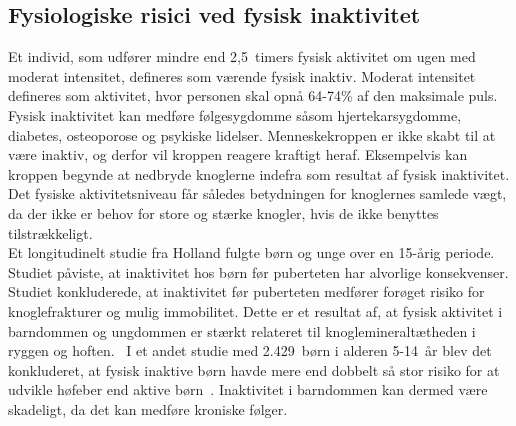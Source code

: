 \subsection{Fysiologiske risici ved fysisk inaktivitet}\label{subsec:inover}
Et individ, som udfører mindre end 2,5~timers fysisk aktivitet om ugen med moderat intensitet, defineres som værende fysisk inaktiv. Moderat intensitet defineres som aktivitet, hvor personen skal opnå 64-74\% af den maksimale puls.~\citep{Kiens2007} \\
Fysisk inaktivitet kan medføre følgesygdomme såsom hjertekarsygdomme, diabetes, osteoporose og psykiske lidelser. Menneskekroppen er ikke skabt til at være inaktiv, og derfor vil kroppen reagere kraftigt heraf. Eksempelvis kan kroppen begynde at nedbryde knoglerne indefra som resultat af fysisk inaktivitet. Det fysiske aktivitetsniveau får således betydningen for knoglernes samlede vægt, da der ikke er behov for store og stærke knogler, hvis de ikke benyttes tilstrækkeligt.~\citep{Kiens2007,Reshma2002,Martini2012} \\
Et longitudinelt studie fra Holland fulgte børn og unge over en 15-årig periode. Studiet påviste, at inaktivitet hos børn før puberteten har alvorlige konsekvenser. Studiet konkluderede, at inaktivitet før puberteten medfører forøget risiko for knoglefrakturer og mulig immobilitet. Dette er et resultat af, at fysisk aktivitet i barndommen og ungdommen er stærkt relateret til knoglemineraltætheden i ryggen og hoften.~\citep{Kemper2000} I et andet studie med 2.429~børn i alderen 5-14~år blev det konkluderet, at fysisk inaktive børn havde mere end dobbelt så stor risiko for at udvikle høfeber end aktive børn~\citep{Kohlhammer2006}. Inaktivitet i barndommen kan dermed være skadeligt, da det kan medføre kroniske følger.


